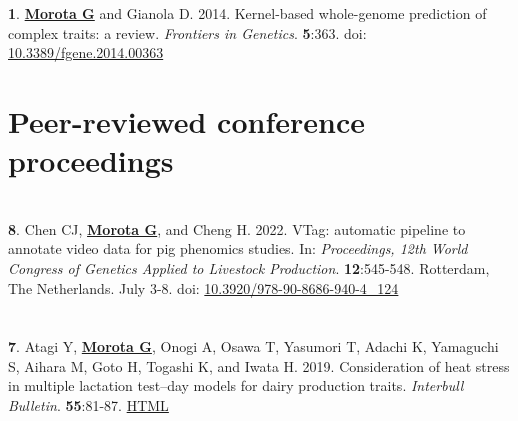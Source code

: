 \documentclass[margin,line,10pt]{res}
\newenvironment{list1}{
  \begin{list}{\ding{113}}{%
      \setlength{\itemsep}{0in}
      \setlength{\parsep}{0in} \setlength{\parskip}{0in}
      \setlength{\topsep}{0in} \setlength{\partopsep}{0in} 
      \setlength{\leftmargin}{0.17in}}}{\end{list}}
\begin{document}
\begin{resume}
\begin{list1}
\end{list1}


\section{}
\begin{list1}

 \item [{\bf 1}.]  {\bf \underline{Morota G}} and Gianola D. 2014. 
  Kernel-based whole-genome prediction of complex traits: a review. \emph{Frontiers in Genetics}. {\bf 5}:363. doi: \textcolor{blue}{\href{http://dx.doi.org/10.3389/fgene.2014.00363}{10.3389/fgene.2014.00363}} 

\end{list1}




\vspace{1.0cm}
\section{\sc Peer-reviewed conference proceedings}
\vspace{1.5cm}

\section{}
\begin{list1}

\item [{\bf 8}.] Chen CJ, \textbf{\underline{Morota G}}, and Cheng H. 2022. VTag: automatic pipeline to annotate video data for pig phenomics studies. In: \emph{Proceedings, 12th World Congress of Genetics Applied to Livestock Production}. \textbf{12}:545-548. Rotterdam, The Netherlands. July 3-8. doi: \textcolor{blue}{\href{https://doi.org/10.3920/978-90-8686-940-4_124
}{10.3920/978-90-8686-940-4\_124}}  

\end{list1}

\section{}
\begin{list1}

\item [{\bf 7}.] Atagi Y, {\bf \underline{Morota G}}, Onogi A, Osawa T, Yasumori T, Adachi K, Yamaguchi S, Aihara M, Goto H, Togashi K, and Iwata H. 2019. Consideration of heat stress in multiple lactation test–day models for dairy production traits. \emph{Interbull Bulletin}. \textbf{55}:81-87. \textcolor{blue}{\href{https://journal.interbull.org/index.php/ib/article/view/1467}{HTML}}


\end{list1}
\end{resume}
\end{document}
